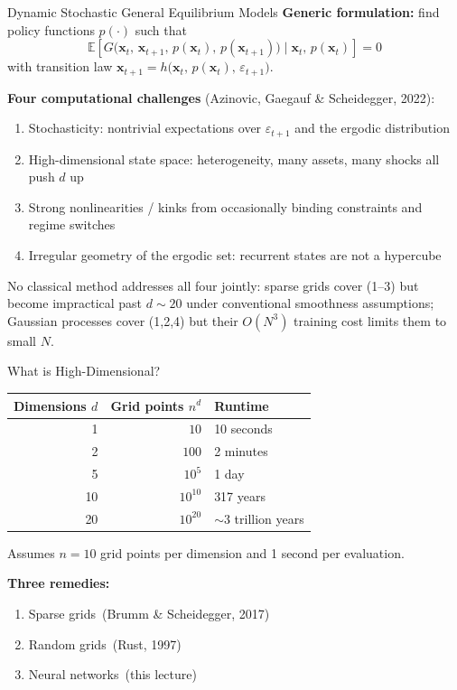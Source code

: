 \documentclass[aspectratio=169,11pt]{beamer}
\newcommand{\emphc}[1]{\textcolor{harvardcrimson}{#1}}
\newcommand{\x}{\bm{x}}
\newcommand{\E}[1]{\mathbb{E}\!\left[#1\right]}
\begin{document}
\begin{frame}{Dynamic Stochastic General Equilibrium Models}
\textbf{Generic formulation:} find policy functions $p(\cdot)$ such that
\[
\E{G\bigl(\x_t,\,\x_{t+1},\,p(\x_t),\,p(\x_{t+1})\bigr) \;\Big|\; \x_t,\,p(\x_t)} = 0
\]
with transition law $\x_{t+1} = h\bigl(\x_t,\,p(\x_t),\,\varepsilon_{t+1}\bigr)$.

\vspace{0.4em}
\textbf{Four computational challenges} (Azinovic, Gaegauf \& Scheidegger, 2022):
\begin{enumerate}
    \setlength{\itemsep}{1pt}
    \item \emphc{Stochasticity}: nontrivial expectations over $\varepsilon_{t+1}$ and the ergodic distribution
    \item \emphc{High-dimensional} state space: heterogeneity, many assets, many shocks all push $d$ up
    \item \emphc{Strong nonlinearities / kinks} from occasionally binding constraints and regime switches
    \item \emphc{Irregular geometry} of the ergodic set: recurrent states are not a hypercube
\end{enumerate}

\vspace{0.2em}
{\footnotesize No classical method addresses all four jointly: sparse grids cover (1--3) but become impractical past $d \sim 20$ under conventional smoothness assumptions; Gaussian processes cover (1,2,4) but their $O(N^3)$ training cost limits them to small $N$.}
\end{frame}

\begin{frame}{What is High-Dimensional?}
\begin{center}
\begin{tabular}{rrl}
\toprule
\textbf{Dimensions $d$} & \textbf{Grid points $n^d$} & \textbf{Runtime} \\
\midrule
1 & $10$ & 10 seconds \\
2 & $100$ & 2 minutes \\
5 & $10^5$ & 1 day \\
10 & $10^{10}$ & 317 years \\
20 & $10^{20}$ & $\sim 3$ trillion years \\
\bottomrule
\end{tabular}
\end{center}

\vspace{0.5em}
{\small Assumes $n = 10$ grid points per dimension and 1 second per evaluation.}

\vspace{0.5em}
\textbf{Three remedies:}
\begin{enumerate}
    \item \emphc{Sparse grids}~(Brumm \& Scheidegger, 2017)
    \item \emphc{Random grids}~(Rust, 1997)
    \item \emphc{Neural networks}~(this lecture)
\end{enumerate}
\end{frame}
\end{document}
